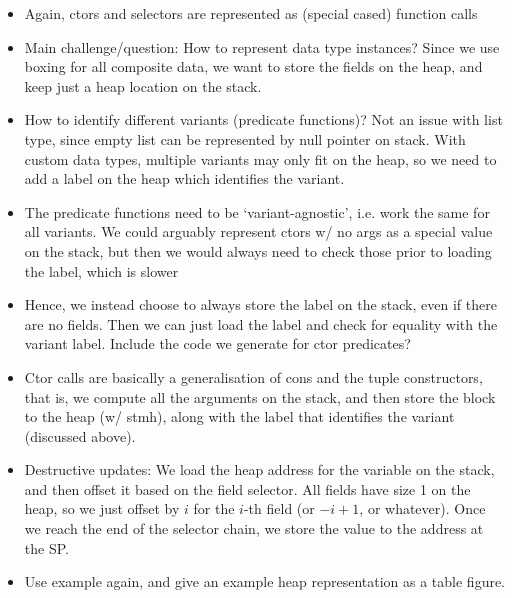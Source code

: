\begin{itemize}
  \item Again, ctors and selectors are represented as (special cased) function
        calls
  \item Main challenge/question: How to represent data type instances? Since we
        use boxing for all composite data, we want to store the fields on the
        heap, and keep just a heap location on the stack.
  \item How to identify different variants (predicate functions)? Not an issue
        with list type, since empty list can be represented by null pointer on
        stack. With custom data types, multiple variants may only fit on the
        heap, so we need to add a label on the heap which identifies the variant.

  \item The predicate functions need to be `variant-agnostic', i.e. work the
        same for all variants. We could arguably represent ctors w/ no args as
        a special value on the stack, but then we would always need to check
        those prior to loading the label, which is slower

  \item Hence, we instead choose to always store the label on the stack, even if
        there are no fields. Then we can just load the label and check for
        equality with the variant label.
        Include the code we generate for ctor predicates?

  \item Ctor calls are basically a generalisation of cons and the tuple
        constructors, that is, we compute all the arguments on the stack, and
        then store the block to the heap (w/ stmh), along with the label that
        identifies the variant (discussed above).

  \item Destructive updates: We load the heap address for the variable on the
        stack, and then offset it based on the field selector.
        All fields have size 1 on the heap, so we just offset by $i$ for the $i$-th
        field (or $-i+1$, or whatever).
        Once we reach the end of the selector chain, we store the value to the
        address at the SP.

  \item Use  example again, and give an example heap representation as
        a table figure.
\end{itemize}
